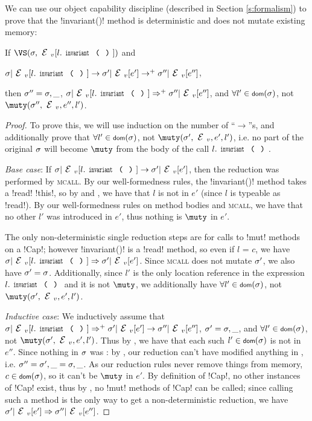 We can use our object capability discipline (described in Section \ref{s:formalism}) to prove that the \Q!invariant()! method is deterministic and does not mutate existing memory:%
\SS\begin{Lemma}[Determinism]\rm If $\VS(\s, \EV[l.\invariant])$ and
\begin{iitemize}
\item[] $\s|\EV[l.\invariant] \rightarrow \s'|\EV[e'] \rightarrow^{+} \s''|\EV[e'']$,
\end{iitemize}

\indent then $\sigma'' = \sigma,\_$, $\s|\EV[l.\invariant] \Rightarrow^+ \s''|\EV[e'']$, and $\forall l' \in \dom(\s)$, not $\muty(\s'', \EV, e'', l')$.
\end{Lemma}\SS
\begin{proof}
To prove this, we will use induction on the number of ``$\rightarrow$''s, and additionally prove that $\forall l' \in \dom(\s)$, not $\muty(\s', \EV, e', l')$, i.e. no part of the original $\sigma$ will become $\muty$ from the body of the call $l.\invariant$.

\emph{Base case}: If $\s|\EV[l.\invariant] \rightarrow \s'|\EV[e']$, then the reduction was performed by \textsc{mcall}.
By our well-formedness rules, the \Q!invariant()! method takes a \Q!read! \Q!this!, so by  and , we have that $l$ is not \muty in $e'$ (since $l$ is typeable as \Q!read!). By our well-formedness rules on method bodies and \textsc{mcall}, we have that no other $l'$ was introduced in $e'$, thus nothing is $\muty$ in $e'$.

The only non-deterministic single reduction steps are for calls to \Q!mut! methods on a \Q!Cap!; however \Q!invariant()! is a \Q!read! method, so even if $l$ = $c$, we have $\s|\EV[l.\invariant] \Rightarrow \s'|\EV[e']$. Since \textsc{mcall} does not mutate $\sigma'$, we also have $\sigma' = \sigma$.
Additionally, since $l'$ is the only location reference in the expression $l.\invariant$ and it is not $\muty$, we additionally have $\forall l' \in \dom(\s)$, not $\muty(\s', \EV, e', l')$.

\emph{Inductive case}: We inductively assume that $\s|\EV[l.\invariant] \Rightarrow^+ \s'|\EV[e'] \rightarrow \s''|\EV[e'']$, $\sigma' = \sigma,\_$, and $\forall l' \in \dom(\s)$, not $\muty(\s', \EV, e', l')$. Thus by , we have that each such $l' \in \dom(\s)$ is not \muty in $e''$. Since nothing in $\sigma$ was \muty: by , our reduction can't have modified anything in \s, i.e. $\sigma'' = \sigma',\_ = \sigma,\_$. As our reduction rules never remove things from memory, $c \in \dom(\s)$, so it can't be $\muty$ in $e'$. By definition of \Q!Cap!, no other instances of \Q!Cap! exist, thus by , no \Q!mut! methods of \Q!Cap! can be called; since calling such a method is the only way to get a non-deterministic reduction, we have $\s'|\EV[e'] \Rightarrow \s''|\EV[e'']$.
\end{proof}

